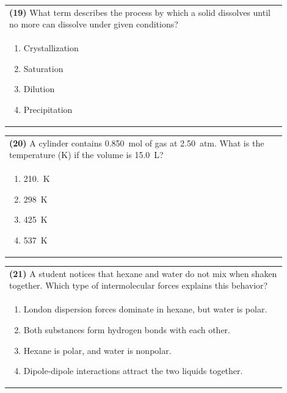 \documentclass{article}
\begin{document}
\noindent\begin{tabular}{|p{0.9\linewidth}|}
\hline
\textbf{(19)} What term describes the process by which a solid dissolves until no more can dissolve under given conditions?\\[0.2cm]
\begin{minipage}[t]{0.85\linewidth}
\begin{enumerate}[label=\alph*.]
\item Crystallization
\item Saturation
\item Dilution
\item Precipitation
\end{enumerate}
\end{minipage}\\[0.2cm]
\hline
\end{tabular}

\noindent\begin{tabular}{|p{0.9\linewidth}|}
\hline
\textbf{(20)} A cylinder contains 0.850~mol of gas at 2.50~atm. What is the temperature (K) if the volume is 15.0~L?\\[0.2cm]

\begin{minipage}[t]{0.85\linewidth}
\begin{enumerate}[label=\alph*.]
\item 210.~K
\item 298~K
\item 425~K
\item 537~K
\end{enumerate}
\end{minipage}\\[0.2cm]
\hline
\end{tabular}

\noindent\begin{tabular}{|p{0.9\linewidth}|}
\hline
\textbf{(21)} A student notices that hexane and water do not mix when shaken together. Which type of intermolecular forces explains this behavior?\\[0.2cm]
\begin{minipage}[t]{0.85\linewidth}
\begin{enumerate}[label=\alph*.]
\item London dispersion forces dominate in hexane, but water is polar.
\item Both substances form hydrogen bonds with each other.
\item Hexane is polar, and water is nonpolar.
\item Dipole-dipole interactions attract the two liquids together.
\end{enumerate}
\end{minipage}\\[0.2cm]
\hline
\end{tabular}
\end{document}
